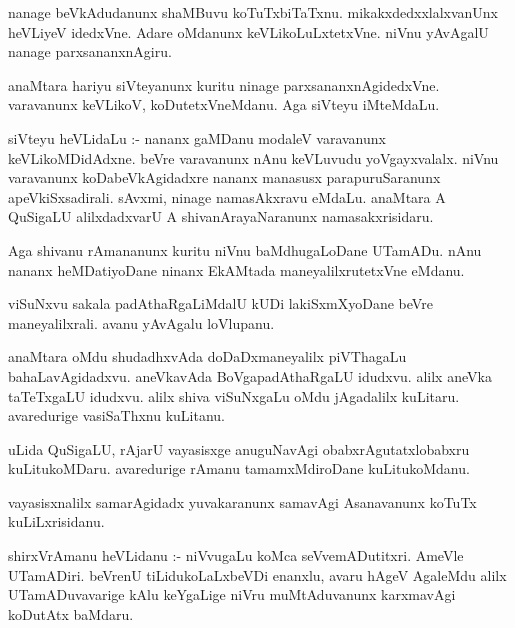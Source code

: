 \documentclass{article}
\begin{document}
\begin{mn}
nanage  beVkAdudanunx  shaMBuvu  koTuTxbiTaTxnu.  mikakxdedxxlalxvanUnx  heVLiyeV  idedxVne.  Adare  oMdanunx  keVLikoLuLxtetxVne.  
niVnu  yAvAgalU  nanage  parxsananxnAgiru.
\end{mn}

\begin{mn}
anaMtara  hariyu  siVteyanunx  kuritu  ninage  parxsananxnAgidedxVne.  varavanunx  keVLikoV,  koDutetxVneMdanu.  Aga  siVteyu  iMteMdaLu.
\end{mn}

\begin{mn}
siVteyu  heVLidaLu :- nananx  gaMDanu  modaleV  varavanunx  keVLikoMDidAdxne.  beVre  varavanunx  nAnu  keVLuvudu  yoVgayxvalalx.  niVnu  
varavanunx  koDabeVkAgidadxre  nananx  manasusx  parapuruSaranunx  apeVkiSxsadirali.  sAvxmi,  ninage  namasAkxravu  eMdaLu.  anaMtara  A  
QuSigaLU  alilxdadxvarU  A  shivanArayaNaranunx  namasakxrisidaru.
\end{mn}

\begin{mn}
Aga   shivanu  rAmananunx  kuritu  niVnu  baMdhugaLoDane  UTamADu.  nAnu  nananx  heMDatiyoDane  ninanx  EkAMtada  maneyalilxrutetxVne  eMdanu.
\end{mn}

\begin{mn}
viSuNxvu  sakala  padAthaRgaLiMdalU  kUDi  lakiSxmXyoDane  beVre  maneyalilxrali.  avanu  yAvAgalu  loVlupanu.
\end{mn}

\begin{mn}
anaMtara  oMdu  shudadhxvAda  doDaDxmaneyalilx  piVThagaLu  bahaLavAgidadxvu.  aneVkavAda  BoVgapadAthaRgaLU  idudxvu.  alilx  aneVka  taTeTxgaLU  
idudxvu.  alilx  shiva  viSuNxgaLu  oMdu  jAgadalilx  kuLitaru.  avaredurige  vasiSaThxnu  kuLitanu.
\end{mn}

\begin{mn}
uLida  QuSigaLU,  rAjarU  vayasisxge  anuguNavAgi  obabxrAgutatxlobabxru  kuLitukoMDaru.  avaredurige  rAmanu  tamamxMdiroDane  kuLitukoMdanu.
\end{mn}

\begin{mn}
vayasisxnalilx  samarAgidadx  yuvakaranunx  samavAgi  Asanavanunx  koTuTx  kuLiLxrisidanu.
\end{mn}

\begin{mn}
shirxVrAmanu  heVLidanu :- niVvugaLu  koMca  seVvemADutitxri. AmeVle  UTamADiri.  beVrenU  tiLidukoLaLxbeVDi  enanxlu,  avaru  hAgeV  AgaleMdu  
alilx  UTamADuvavarige  kAlu  keYgaLige  niVru  muMtAduvanunx  karxmavAgi  koDutAtx  baMdaru.
\end{mn}
\end{document}
